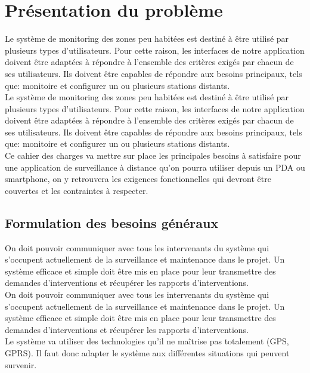 \section{Présentation du problème}


Le système de monitoring des zones peu habitées est destiné à être utilisé par plusieurs types 
d'utilisateurs. Pour cette raison, les interfaces de notre application doivent être adaptées à 
répondre à l'ensemble des critères exigés par chacun de ses utilisateurs.
Ils doivent être capables de répondre aux besoins principaux, tels que: monitoire et configurer 
un ou plusieurs stations distants.\\

Le système de monitoring des zones peu habitées est destiné à être utilisé
par plusieurs types d'utilisateurs. Pour cette raison, les interfaces de
notre application doivent être adaptées à répondre à l'ensemble des
critères exigés par chacun de ses utilisateurs. Ils doivent être capables
de répondre aux besoins principaux, tels que: monitoire et configurer un ou
plusieurs stations distants.\\


Ce cahier des charges va mettre sur place les principales besoins à satisfaire pour une application 
de surveillance à distance qu'on pourra utiliser depuis un PDA ou smartphone, on y retrouvera les exigences 
fonctionnelles qui devront être couvertes et les contraintes à respecter.


\subsection{Formulation des besoins généraux}


On doit pouvoir communiquer avec tous les intervenants du système qui s'occupent actuellement de 
la surveillance et maintenance dans le projet. Un système efficace et simple doit être mis en place 
pour leur transmettre des demandes d'interventions et récupérer les rapports d'interventions.\\

On doit pouvoir communiquer avec tous les intervenants du système qui s'occupent actuellement de la surveillance et maintenance dans le projet. Un système efficace et simple doit être mis en place pour leur transmettre des demandes d'interventions et récupérer les rapports d'interventions.\\


Le système va utiliser des technologies qu'il ne maîtrise pas totalement (GPS, GPRS). Il faut donc 
adapter le système aux différentes situations qui peuvent survenir.\\

